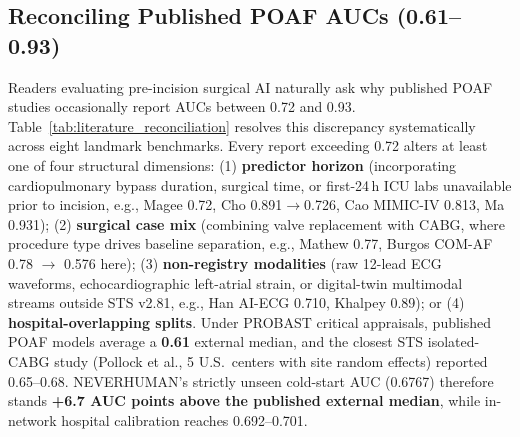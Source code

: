 \subsection{Reconciling Published POAF AUCs (0.61--0.93)}
Readers evaluating pre-incision surgical AI naturally ask why published POAF studies occasionally report AUCs between 0.72 and 0.93. Table~\ref{tab:literature_reconciliation} resolves this discrepancy systematically across eight landmark benchmarks. Every report exceeding 0.72 alters at least one of four structural dimensions: (1) \textbf{predictor horizon} (incorporating cardiopulmonary bypass duration, surgical time, or first-24\,h ICU labs unavailable prior to incision, e.g., Magee 0.72,\cite{magee2007atrial} Cho 0.891$\to$0.726,\cite{cho2026poaf} Cao MIMIC-IV 0.813,\cite{cao2025mimic4} Ma 0.931\cite{ma2025noaf}); (2) \textbf{surgical case mix} (combining valve replacement with CABG, where procedure type drives baseline separation, e.g., Mathew 0.77,\cite{mathew2004multicenter} Burgos COM-AF 0.78 $\to$ 0.576 here\cite{burgos2021comaf}); (3) \textbf{non-registry modalities} (raw 12-lead ECG waveforms, echocardiographic left-atrial strain, or digital-twin multimodal streams outside STS v2.81, e.g., Han AI-ECG 0.710,\cite{han2025aiecg} Khalpey 0.89\cite{khalpey2026digital}); or (4) \textbf{hospital-overlapping splits}. Under PROBAST critical appraisals, published POAF models average a \textbf{0.61} external median,\cite{fields2025poaf,lopeztuesta2026poaf} and the closest STS isolated-CABG study (Pollock et al., 5 U.S.\ centers with site random effects) reported 0.65--0.68.\cite{pollock2018chargeaf} NEVERHUMAN's strictly unseen cold-start AUC (0.6767) therefore stands \textbf{+6.7 AUC points above the published external median}, while in-network hospital calibration reaches 0.692--0.701.



